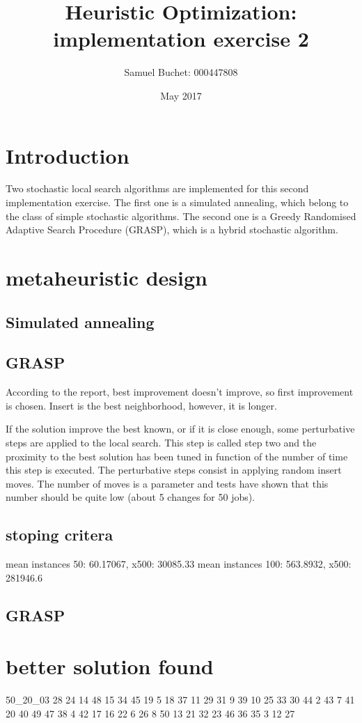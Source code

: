 \documentclass{article}
\title{Heuristic Optimization: implementation exercise 2}
\author{Samuel Buchet: 000447808}
\date{May 2017}
\begin{document}
\maketitle

\section{Introduction}

Two stochastic local search algorithms are implemented for this second implementation exercise.
The first one is a simulated annealing, which belong to the class of simple stochastic algorithms.
The second one is a Greedy Randomised Adaptive Search Procedure (GRASP), which is a hybrid stochastic algorithm.

\section{metaheuristic design}

\subsection{Simulated annealing}

\subsection{GRASP}

According to the report, best improvement doesn't improve, so first improvement is chosen.
Insert is the best neighborhood, however, it is longer.\newline

If the solution improve the best known, or if it is close enough, some perturbative steps are applied to the local search.
This step is called step two and the proximity to the best solution has been tuned in function of the number of time this step is executed.
The perturbative steps consist in applying random insert moves.
The number of moves is a parameter and tests have shown that this number should be quite low (about 5 changes for 50 jobs).

\subsection{stoping critera}

mean instances 50: 60.17067, x500: 30085.33\newline
mean instances 100: 563.8932, x500: 281946.6

\subsection{GRASP}



\section{better solution found}

50_20_03  28 24 14 48 15 34 45 19 5 18 37 11 29 31 9 39 10 25 33 30 44 2 43 7 41 20 40 49 47 38 4 42 17 16 22 6 26 8 50 13 21 32 23 46 36 35 3 12 27 
\end{document}
